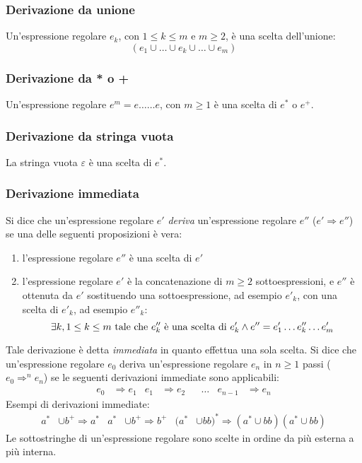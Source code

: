 \documentclass[11pt]{article}
\begin{document}
\subsubsection*{Derivazione da unione}
Un'espressione regolare $e_k$, con $1\leq k\leq m$ e $m\geq2$, è una scelta dell'unione:
\begin{equation*}
    (e_1\cup \dots\cup e_k\cup \dots\cup e_m)
\end{equation*}
\subsubsection*{Derivazione da * o +}
Un'espressione regolare $e^m=e\dots \dots e$, con $m\geq 1$ è una scelta di $e^*$ o $e^+$.
\subsubsection*{Derivazione da stringa vuota}
La stringa vuota $\varepsilon$ è una scelta di $e^*$.
\subsubsection*{Derivazione immediata}
Si dice che un'espressione regolare $e'$ \textit{deriva} un'espressione regolare $e''$ ($e'\Rightarrow e''$) se una delle 
seguenti proposizioni è vera:
\begin{enumerate}
    \item l'espressione regolare $e''$ è una scelta di $e'$
    \item l'espressione regolare $e'$ è la concatenazione di $m\geq 2$ sottoespressioni, e $e''$ è ottenuta da $e'$ sostituendo 
    una sottoespressione, ad esempio $e'_k$, con una scelta di $e'_k$, ad esempio $e''_k$:
    \begin{equation*}
        \exists k, 1\leq k\leq m \textnormal{ tale che }e''_k \textnormal{ è una scelta di } e'_k\wedge e''=e'_1\dots e''_k\dots e'_m
    \end{equation*}
\end{enumerate}
Tale derivazione è detta \textit{immediata} in quanto effettua una sola scelta. Si dice che un'espressione regolare $e_0$
deriva un'espressione regolare $e_n$ in $n\geq 1$ passi ($e_0\Rightarrow^n e_n$) se le seguenti derivazioni immediate sono 
applicabili:
\begin{align*}
    e_0&\Rightarrow e_1 & e_1&\Rightarrow e_2 & &\dots & e_{n-1}&\Rightarrow e_n
\end{align*}
Esempi di derivazioni immediate:
\begin{align*}
    a^*&\cup b^+\Rightarrow a^* & a^*&\cup b^+\Rightarrow b^+ & (a^*&\cup bb)^*\Rightarrow(a^*\cup bb)(a^*\cup bb)
\end{align*}
Le sottostringhe di un'espressione regolare sono scelte in ordine da più esterna a più interna.
\end{document}
